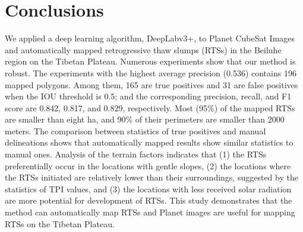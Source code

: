 \documentclass[preprint,12pt,authoryear]{elsarticle}
\begin{document}


\section{Conclusions}
\label{sec_conclusion}

We applied a deep learning algorithm, DeepLabv3+, to Planet CubeSat Images and automatically mapped retrogressive thaw slumps (RTSs) in the Beiluhe region on the Tibetan Plateau. Numerous experiments show that our method is robust. The experiments with the highest average precision (0.536) contains 196 mapped polygons. Among them, 165 are true positives and 31 are false positives when the IOU threshold is 0.5; and the corresponding precision, recall, and F1 score are 0.842, 0.817, and 0.829, respectively. Most (95\%) of the mapped RTSs are smaller than eight ha, and 90\% of their perimeters are smaller than 2000 meters. The comparison between statistics of true positives and manual delineations shows that automatically mapped results show similar statistics to manual ones. Analysis of the terrain factors indicates that (1) the RTSs preferentially occur in the locations with gentle slopes, (2) the locations where the RTSs initiated are relatively lower than their surroundings, suggested by the statistics of TPI values, and (3) the locations with less received solar radiation are more potential for development of RTSs. This study demonstrates that the method can automatically map RTSs and Planet images are useful for mapping RTSs on the Tibetan Plateau. 
 
\end{document}
